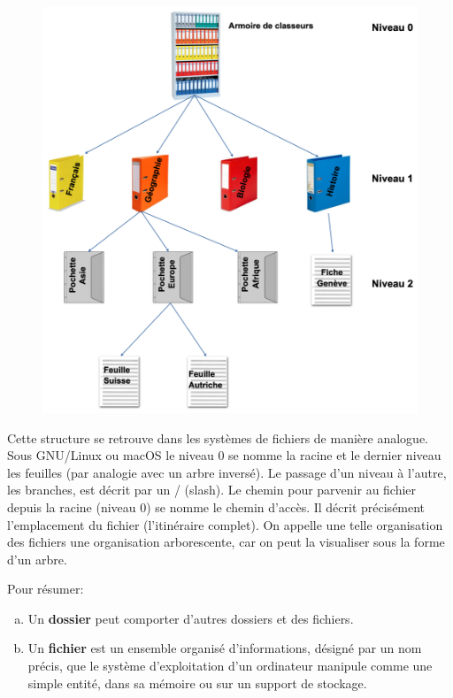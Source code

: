 \documentclass[11pt, a4paper]{book}
\begin{document}
\begin{figure}[h!]
\centering
\includegraphics[width=12cm]{images/organisationfichiers}
\end{figure}

Cette structure se retrouve dans les systèmes de fichiers de manière analogue. Sous GNU/Linux ou macOS le niveau 0 se nomme la racine et le dernier niveau les feuilles (par analogie avec un arbre inversé). Le passage d’un niveau à l’autre, les branches, est décrit par un / (slash). Le chemin pour parvenir au fichier depuis la racine (niveau 0) se nomme le chemin d’accès. Il décrit précisément l’emplacement du fichier (l’itinéraire complet). On appelle une telle organisation des fichiers une organisation arborescente, car on peut la visualiser sous la forme d’un arbre.

Pour résumer: 
\begin{enumerate}[a)]
\item Un {\bf dossier} peut comporter d’autres dossiers et des fichiers.
\item Un {\bf fichier} est un ensemble organisé d'informations, désigné par un nom précis, que le système d'exploitation d'un ordinateur manipule comme une simple entité, dans sa mémoire ou sur un support de stockage.
\end{enumerate}
\end{document}
